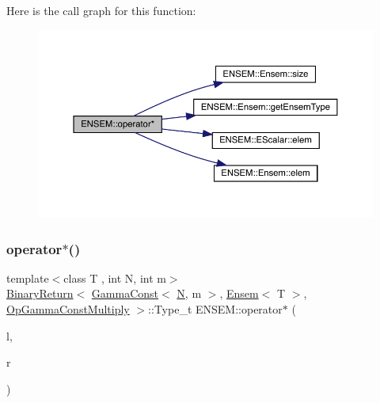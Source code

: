 Here is the call graph for this function\+:\nopagebreak
\begin{figure}[H]
\begin{center}
\leavevmode
\includegraphics[width=350pt]{d1/d9e/group__eensem_ga56ee052eb9134728080172ffe2e946af_cgraph}
\end{center}
\end{figure}
\mbox{\label{group__eensem_gab92286e5b611f00cb8f733f9d41d06a4}} 
\subsubsection{\texorpdfstring{operator$\ast$()}{operator*()}\hspace{0.1cm}{\footnotesize\ttfamily [4/11]}}
{\footnotesize\ttfamily template$<$class T , int N, int m$>$ \\
\mbox{\hyperlink{structENSEM_1_1BinaryReturn}{Binary\+Return}}$<$ \mbox{\hyperlink{classENSEM_1_1GammaConst}{Gamma\+Const}}$<$ \mbox{\hyperlink{operator__name__util_8cc_a7722c8ecbb62d99aee7ce68b1752f337}{N}}, m $>$, \mbox{\hyperlink{classENSEM_1_1Ensem}{Ensem}}$<$ T $>$, \mbox{\hyperlink{structENSEM_1_1OpGammaConstMultiply}{Op\+Gamma\+Const\+Multiply}} $>$\+::Type\+\_\+t E\+N\+S\+E\+M\+::operator$\ast$ (\begin{DoxyParamCaption}\item[{const \mbox{\hyperlink{classENSEM_1_1GammaConst}{Gamma\+Const}}$<$ \mbox{\hyperlink{operator__name__util_8cc_a7722c8ecbb62d99aee7ce68b1752f337}{N}}, m $>$ \&}]{l,  }\item[{const \mbox{\hyperlink{classENSEM_1_1Ensem}{Ensem}}$<$ T $>$ \&}]{r }\end{DoxyParamCaption})\hspace{0.3cm}{\ttfamily [inline]}}




